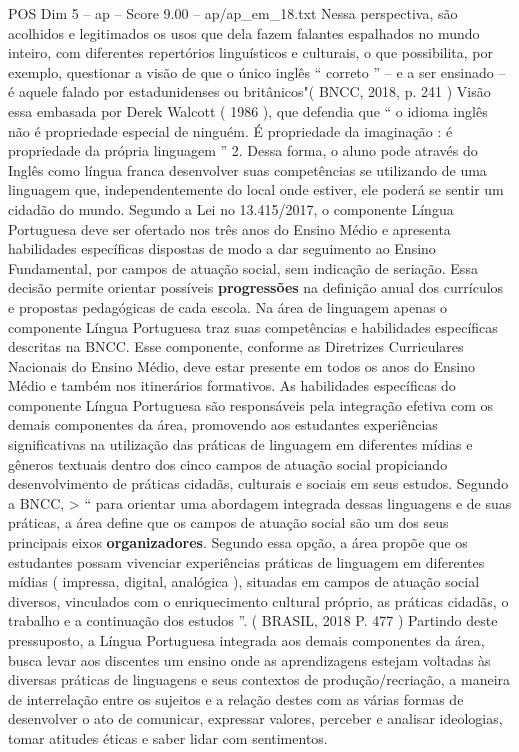 \begin{textsample}{POS Dim 5 – ap – Score 9.00 – ap/ap\_em\_18.txt}
Nessa perspectiva, são acolhidos e legitimados os usos que dela fazem falantes espalhados no mundo inteiro, com diferentes repertórios linguísticos e culturais, o que possibilita, por exemplo, questionar a visão de que o único inglês “ correto ” – e a ser ensinado – é aquele falado por estadunidenses ou britânicos"( BNCC, 2018, p. 241 ) Visão essa embasada por Derek Walcott ( 1986 ), que defendia que “ o idioma inglês não é propriedade especial de ninguém.
É propriedade da imaginação : é propriedade da própria linguagem ” 2.
Dessa forma, o aluno pode através do Inglês como língua franca desenvolver suas competências se utilizando de uma linguagem que, independentemente do local onde estiver, ele poderá se sentir um cidadão do mundo.
Segundo a Lei no 13.415/2017, o componente Língua Portuguesa deve ser ofertado nos três anos do Ensino Médio e apresenta habilidades específicas dispostas de modo a dar seguimento ao Ensino Fundamental, por campos de atuação social, sem indicação de seriação.
Essa decisão permite orientar possíveis \textbf{progressões} na definição anual dos currículos e propostas pedagógicas de cada escola.
Na área de linguagem apenas o componente Língua Portuguesa traz suas competências e habilidades específicas descritas na BNCC.
Esse componente, conforme as Diretrizes Curriculares Nacionais do Ensino Médio, deve estar presente em todos os anos do Ensino Médio e também nos itinerários formativos.
As habilidades específicas do componente Língua Portuguesa são responsáveis pela integração efetiva com os demais componentes da área, promovendo aos estudantes experiências significativas na utilização das práticas de linguagem em diferentes mídias e gêneros textuais dentro dos cinco campos de atuação social propiciando desenvolvimento de práticas cidadãs, culturais e sociais em seus estudos.
Segundo a BNCC, > “ para orientar uma abordagem integrada dessas linguagens e de suas práticas, a área define que os campos de atuação social são um dos seus principais eixos \textbf{organizadores}.
Segundo essa opção, a área propõe que os estudantes possam vivenciar experiências práticas de linguagem em diferentes mídias ( impressa, digital, analógica ), situadas em campos de atuação social diversos, vinculados com o enriquecimento cultural próprio, as práticas cidadãs, o trabalho e a continuação dos estudos ”. ( BRASIL, 2018 P. 477 ) Partindo deste pressuposto, a Língua Portuguesa integrada aos demais componentes da área, busca levar aos discentes um ensino onde as aprendizagens estejam voltadas às diversas práticas de linguagens e seus contextos de produção/recriação, a maneira de interrelação entre os sujeitos e a relação destes com as várias formas de desenvolver o ato de comunicar, expressar valores, perceber e analisar ideologias, tomar atitudes éticas e saber lidar com sentimentos.

\end{textsample}
